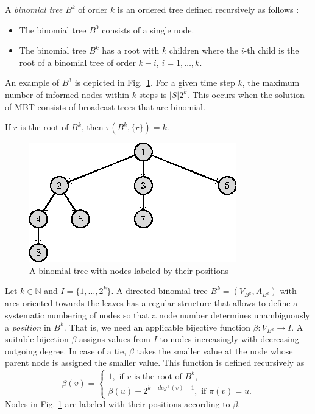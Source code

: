 A \emph{binomial tree} $B^k$ of order $k$ is an ordered tree defined recursively as follows \cite{cormen01}:
\begin{itemize}
\item The binomial tree $B^0$ consists of a single node.
\item The binomial tree $B^k$ has a root with $k$ children where the $i$-th child is the root of a binomial tree of order $k-i$, $i=1,\dots,k$.
\end{itemize}
An example of $B^3$ is depicted in Fig.~\ref{fig:beta}.
For a given time step $k$, the maximum number of informed nodes within $k$ steps is $|S|2^k$.
This occurs when the solution of MBT consists of broadcast trees that are binomial.
\begin{observation}
\label{obs:btspread}
If $r$ is the root of $B^k$, then $\tau(B^k,\{r\})=k$.
\end{observation}
\begin{figure}
\centering
	\includegraphics{figurer/btindex.eps}
\caption{A binomial tree with nodes labeled by their positions}
\label{fig:beta}
\end{figure}

Let $k\in \mathbb{N}$ and $I=\{1,\dots,2^k\}$.
A directed binomial tree $B^k=(V_{B^k},A_{B^k})$ with arcs oriented towards the leaves has a regular structure that allows to define a systematic numbering of nodes so that a node number determines unambiguously a \emph{position} in $B^k$.
That is, we need an applicable bijective function $\beta:V_{B^k}\to I$.
A suitable bijection $\beta$ assigns values from $I$ to nodes increasingly with decreasing outgoing degree.
In case of a tie, $\beta$ takes the smaller value at the node whose parent node is assigned the smaller value.
This function is defined recursively as
\begin{equation*}
\label{eq:beta}
\beta(v)=\begin{cases}
1,\text{ if } v \text{ is the root of } B^k,\\
\beta(u) + 2^{k-deg^+(v)-1}, \text{ if } \pi(v)=u.%
\end{cases}
\end{equation*}
Nodes in Fig. \ref{fig:beta} are labeled with their positions according to $\beta$.

